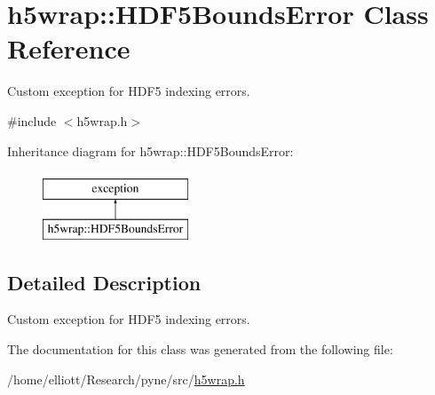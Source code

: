 \hypertarget{classh5wrap_1_1_h_d_f5_bounds_error}{\section{h5wrap\-:\-:H\-D\-F5\-Bounds\-Error Class Reference}
\label{classh5wrap_1_1_h_d_f5_bounds_error}
}


Custom exception for H\-D\-F5 indexing errors.  




{\ttfamily \#include $<$h5wrap.\-h$>$}

Inheritance diagram for h5wrap\-:\-:H\-D\-F5\-Bounds\-Error\-:\begin{figure}[H]
\begin{center}
\leavevmode
\includegraphics[height=2.000000cm]{classh5wrap_1_1_h_d_f5_bounds_error}
\end{center}
\end{figure}


\subsection{Detailed Description}
Custom exception for H\-D\-F5 indexing errors. 

The documentation for this class was generated from the following file\-:\begin{DoxyCompactItemize}
\item 
/home/elliott/\-Research/pyne/src/\hyperlink{h5wrap_8h}{h5wrap.\-h}\end{DoxyCompactItemize}
